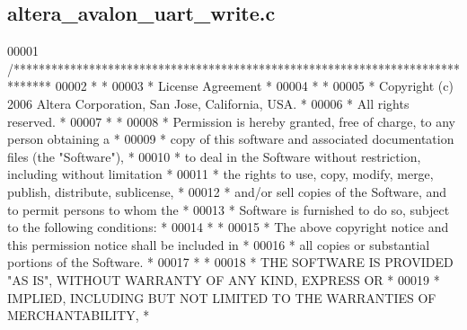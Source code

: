 \subsection{altera\+\_\+avalon\+\_\+uart\+\_\+write.\+c}
\label{altera__avalon__uart__write_8c_source}

\begin{DoxyCode}
00001 \textcolor{comment}{/******************************************************************************}
00002 \textcolor{comment}{*                                                                             *}
00003 \textcolor{comment}{* License Agreement                                                           *}
00004 \textcolor{comment}{*                                                                             *}
00005 \textcolor{comment}{* Copyright (c) 2006 Altera Corporation, San Jose, California, USA.           *}
00006 \textcolor{comment}{* All rights reserved.                                                        *}
00007 \textcolor{comment}{*                                                                             *}
00008 \textcolor{comment}{* Permission is hereby granted, free of charge, to any person obtaining a     *}
00009 \textcolor{comment}{* copy of this software and associated documentation files (the "Software"),  *}
00010 \textcolor{comment}{* to deal in the Software without restriction, including without limitation   *}
00011 \textcolor{comment}{* the rights to use, copy, modify, merge, publish, distribute, sublicense,    *}
00012 \textcolor{comment}{* and/or sell copies of the Software, and to permit persons to whom the       *}
00013 \textcolor{comment}{* Software is furnished to do so, subject to the following conditions:        *}
00014 \textcolor{comment}{*                                                                             *}
00015 \textcolor{comment}{* The above copyright notice and this permission notice shall be included in  *}
00016 \textcolor{comment}{* all copies or substantial portions of the Software.                         *}
00017 \textcolor{comment}{*                                                                             *}
00018 \textcolor{comment}{* THE SOFTWARE IS PROVIDED "AS IS", WITHOUT WARRANTY OF ANY KIND, EXPRESS OR  *}
00019 \textcolor{comment}{* IMPLIED, INCLUDING BUT NOT LIMITED TO THE WARRANTIES OF MERCHANTABILITY,    *}

\end{DoxyCode}
